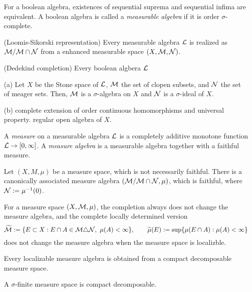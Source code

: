 \documentclass{../../large}
\begin{document}
\begin{prb}
For a boolean algebra, existences of sequential suprema and sequential infima are equivalent.
A boolean algebra is called a \emph{measurable algebra} if it is order $\sigma$-complete.
\begin{parts}
\item (Loomis-Sikorski representation) Every measurable algebra $\mathcal{L}$ is realized as $\mathcal{M}/\mathcal{M}\cap\mathcal{N}$ from a enhanced measurable space $(X,\mathcal{M},\mathcal{N})$.
\item (Dedekind completion) Every boolean algbera $\mathcal{L}$
\end{parts}
\end{prb}
\begin{pf}
(a)
Let $X$ be the Stone space of $\mathcal{L}$, $\mathcal{M}$ the set of clopen subsets, and $\mathcal{N}$ the set of meager sets.
Then, $\mathcal{M}$ is a $\sigma$-algebra on $X$ and $\mathcal{N}$ is a $\sigma$-ideal of $X$.

(b)
complete extension of order continuous homomorphisms and universal property.
regular open algebra of $X$.
\end{pf}



\begin{prb}
A \emph{measure} on a measurable algebra $\mathcal{L}$ is a completely additive monotone function $\mathcal{L}\to[0,\infty]$.
A \emph{measure algebra} is a measurable algebra together with a faithful measure.

Let $(X,M,\mu)$ be a measure space, which is not necessarily faithful.
There is a canonically associated measure algebra $(\mathcal{M}/\mathcal{M}\cap\mathcal{N},\mu)$, which is faithful, where $\mathcal{N}:=\mu^{-1}(0)$.

\end{prb}


\begin{prb}

For a measure space $(X,\mathcal{M},\mu)$, the completion always does not change the measure algebra, and the complete locally determined version
\[\tilde\cM:=\{E\subset X:E\cap A\in\cM\triangle\cN,\ \mu(A)<\infty\},\qquad\tilde\mu(E):=\sup\{\mu(E\cap A):\mu(A)<\infty\}\]
does not change the measure algebra when the measure space is localizble.


\begin{parts}
\item Every localizable measure algebra is obtained from a compact decomposable measure space.
\item A $\sigma$-finite measure space is compact decomposable.
\end{parts}
\end{prb}
\end{document}
